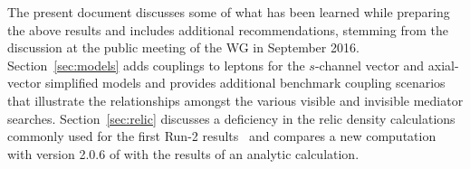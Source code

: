 The present document discusses some of what has been learned while preparing the above results and includes additional recommendations, stemming from the discussion at the public meeting of the WG in September 2016. Section~\ref{sec:models} adds couplings to leptons for the $s$-channel vector and axial-vector simplified models and provides additional benchmark coupling scenarios that illustrate the relationships amongst the various visible and invisible mediator searches. Section~\ref{sec:relic} discusses a deficiency in the relic density calculations commonly used for the first Run-2 results~\cite{Boveia:2016mrp,ATLASsummaryplots,CMS_SummaryPlots_ICHEP} and compares a new computation with version 2.0.6 of \maddm with the results of an analytic calculation. 
